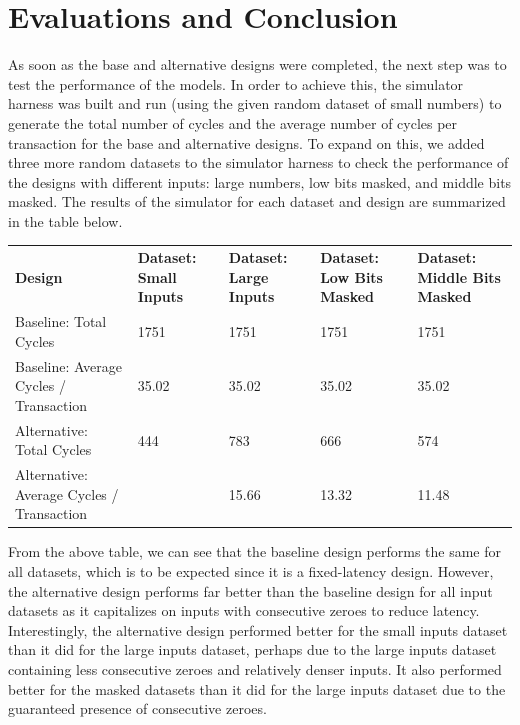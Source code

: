 \documentclass[11pt]{article}
\begin{document}
\section{Evaluations and Conclusion}

As soon as the base and alternative designs were completed, the next step was to test the performance of the models. In order to achieve this, the simulator harness was built and run (using the given random dataset of small numbers) to generate the total number of cycles and the average number of cycles per transaction for the base and alternative designs. To expand on this, we added three more random datasets to the simulator harness to check the performance of the designs with different inputs: large numbers, low bits masked, and middle bits masked. The results of the simulator for each dataset and design are summarized in the table below.

\begin{table}[h]
\begin{tabular}{lllll}
\textbf{Design}                           & \textbf{Dataset: Small Inputs} & \textbf{Dataset: Large Inputs} & \textbf{Dataset: Low Bits Masked} & \textbf{Dataset: Middle Bits Masked} \\
Baseline: Total Cycles                    & 1751                           & 1751                           & 1751                              & 1751                                 \\
Baseline: Average Cycles / Transaction    & 35.02                          & 35.02                          & 35.02                             & 35.02                                \\
Alternative: Total Cycles                 & 444                            & 783                            & 666                               & 574                                  \\
Alternative: Average Cycles / Transaction &                                & 15.66                          & 13.32                             & 11.48                               
\end{tabular}
\end{table}
\caption{}

From the above table, we can see that the baseline design performs the same for all datasets, which is to be expected since it is a fixed-latency design. However, the alternative design performs far better than the baseline design for all input datasets as it capitalizes on inputs with consecutive zeroes to reduce latency. Interestingly, the alternative design performed better for the small inputs dataset than it did for the large inputs dataset, perhaps due to the large inputs dataset containing less consecutive zeroes and relatively denser inputs. It also performed better for the masked datasets than it did for the large inputs dataset due to the guaranteed presence of consecutive zeroes.
\end{document}
